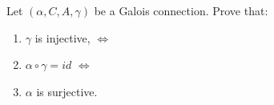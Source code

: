 {Let $(\alpha, C, A, \gamma)$ be a Galois connection. Prove that:
	\begin{enumerate}[label=(\Alph*)]
		\item $\gamma$ is injective, $\iff$
		\item $\alpha \circ \gamma = id$ $\iff$
		\item $\alpha$ is surjective.
	\end{enumerate} 
}
{


}